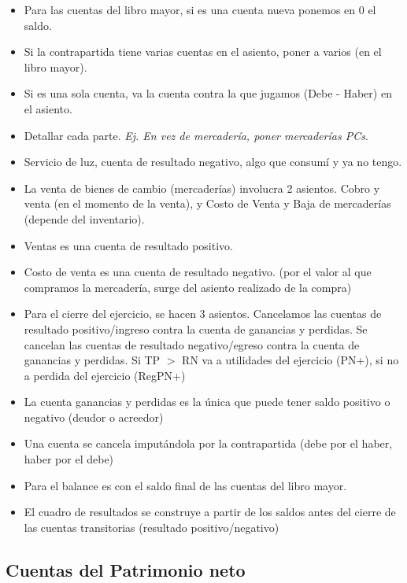 \documentclass[titlepage,a4paper]{article}
\begin{document}
\begin{itemize}
\item Para las cuentas del libro mayor, si es una cuenta nueva ponemos en 0 el saldo.
\item Si la contrapartida tiene varias cuentas en el asiento, poner a varios (en el libro mayor). 
\item Si es una sola cuenta, va la cuenta contra la que jugamos (Debe - Haber) en el asiento.
\item Detallar cada parte. \textit{Ej. En vez de mercadería, poner mercaderías PCs}.
\item Servicio de luz, cuenta de resultado negativo, algo que consumí y ya no tengo.
\item La venta de bienes de cambio (mercaderías) involucra 2 asientos. Cobro y venta (en el momento de la venta), y Costo de Venta y Baja de mercaderías (depende del inventario).
\item Ventas es una cuenta de resultado positivo.
\item Costo de venta es una cuenta de resultado negativo. (por el valor al que compramos la mercadería, surge del asiento realizado de la compra)
\item Para el cierre del ejercicio, se hacen 3 asientos. Cancelamos las cuentas de resultado positivo/ingreso contra la cuenta de ganancias y perdidas. Se cancelan las cuentas de resultado negativo/egreso contra la cuenta de ganancias y perdidas. Si TP $>$ RN va a utilidades del ejercicio (PN+), si no a perdida del ejercicio (RegPN+)
\item La cuenta ganancias y perdidas es la única que puede tener saldo positivo o negativo (deudor o acreedor)
\item Una cuenta se cancela imputándola por la contrapartida (debe por el haber, haber por el debe)
\item Para el balance es con el saldo final de las cuentas del libro mayor.
\item El cuadro de resultados se construye a partir de los saldos antes del cierre de las cuentas transitorias (resultado positivo/negativo)
\end{itemize}


\subsection{Cuentas del Patrimonio neto}
\end{document}
